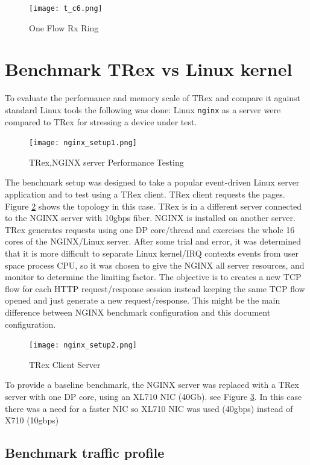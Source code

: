 \documentclass[conference]{IEEEtran}
\begin{document}
\begin{figure}[h]
  \texttt{[image: t\_c6.png]}
  \caption{One Flow Rx Ring}
  \label{fig:rx_ring}
\end{figure}


\section{Benchmark  TRex vs Linux kernel}

To evaluate the performance and memory scale of TRex and compare it against standard Linux tools the following was done: 
Linux \texttt{nginx} as a server were compared to TRex for stressing a device under test.

\begin{figure}[h]
  \texttt{[image: nginx\_setup1.png]}
  \caption{TRex,NGINX server Performance Testing}
  \label{fig:trex_nginx}
\end{figure}

The benchmark setup was designed to take a popular event-driven Linux server application and to test using a TRex client. 
TRex client requests the pages. Figure \ref{fig:trex_nginx} shows the topology in this case. TRex is in a different server connected to the NGINX server with 10gbps fiber. 
NGINX is installed on another server. TRex generates requests using one DP core/thread and exercises the whole 16 cores of the NGINX/Linux server. 
After some trial and error, it was determined that it is more difficult to separate Linux kernel/IRQ contexts events from user space process CPU, 
so it was chosen to give the NGINX all server resources, and monitor to determine the limiting factor.
The objective is to creates a new TCP flow for each HTTP request/response session instead keeping the same TCP flow opened and just generate a new request/response. 
This might be the main difference between NGINX benchmark configuration and this document configuration. 

\begin{figure}[h]
  \texttt{[image: nginx\_setup2.png]}
  \caption{TRex Client Server}
  \label{fig:trex_vs_trex}
\end{figure}

To provide a baseline benchmark, the NGINX server was replaced with a TRex server with one DP core, using an XL710 NIC (40Gb). 
see Figure \ref{fig:trex_vs_trex}. In this case there was a need for a faster NIC so XL710 NIC was used (40gbps) instead of X710 (10gbps)

\subsection{Benchmark traffic profile}
\end{document}
